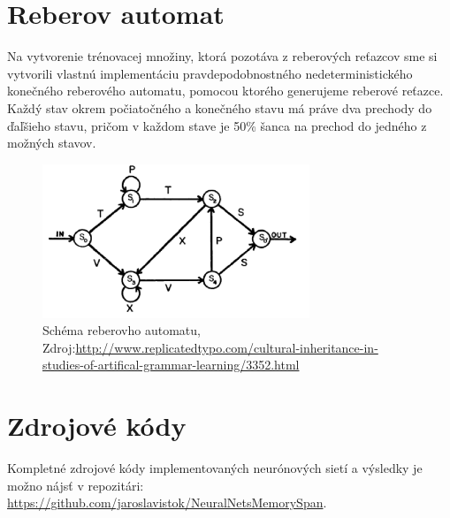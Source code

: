\section{Reberov automat}
Na vytvorenie trénovacej množiny, ktorá pozotáva z reberových reťazcov sme si vytvorili vlastnú implementáciu pravdepodobnostného nedeterministického
konečného reberového automatu, pomocou ktorého generujeme reberové reťazce.
Každý stav okrem počiatočného a konečného stavu má práve dva prechody do ďaľšieho stavu, 
pričom v každom stave je 50\% šanca na prechod do jedného z možných stavov.
\begin{figure}[H]
    \centering
    \includegraphics[width=8cm]{assets/reber}
    \caption{Schéma reberovho automatu, Zdroj:\url{http://www.replicatedtypo.com/cultural-inheritance-in-studies-of-artifical-grammar-learning/3352.html}}
\end{figure}

\section{Zdrojové kódy}
Kompletné zdrojové kódy implementovaných neurónových sietí a výsledky je možno nájsť v repozitári: \url{https://github.com/jaroslavistok/NeuralNetsMemorySpan}.
